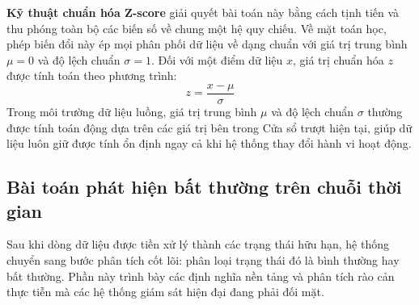     \textbf{Kỹ thuật chuẩn hóa Z-score} giải quyết bài toán này bằng cách tịnh tiến và thu phóng toàn bộ các biến số về chung một hệ quy chiếu. Về mặt toán học, phép biến đổi này ép mọi phân phối dữ liệu về dạng chuẩn với giá trị trung bình $\mu = 0$ và độ lệch chuẩn $\sigma = 1$. Đối với một điểm dữ liệu $x$, giá trị chuẩn hóa $z$ được tính toán theo phương trình:
    $$z = \frac{x - \mu}{\sigma}$$
    Trong môi trường dữ liệu luồng, giá trị trung bình $\mu$ và độ lệch chuẩn $\sigma$ thường được tính toán động dựa trên các giá trị bên trong Cửa sổ trượt hiện tại, giúp dữ liệu luôn giữ được tính ổn định ngay cả khi hệ thống thay đổi hành vi hoạt động.
    

\subsection{Bài toán phát hiện bất thường trên chuỗi thời gian}
Sau khi dòng dữ liệu được tiền xử lý thành các trạng thái hữu hạn, hệ thống chuyển sang bước phân tích cốt lõi: phân loại trạng thái đó là bình thường hay bất thường. Phần này trình bày các định nghĩa nền tảng và phân tích rào cản thực tiễn mà các hệ thống giám sát hiện đại đang phải đối mặt.
